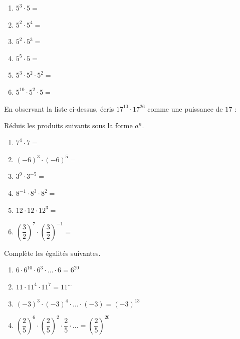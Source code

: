 \documentclass[../math2.tex]{subfiles}
\begin{document}
\begin{enumerate}[cols=2, itemsep=2cm]
	\item $5^3 \cdot 5=$
	\item $5^2 \cdot 5^4=$
	\item $5^2 \cdot 5^3=$
	\item $5^5 \cdot 5=$
	\item $5^3 \cdot 5^2 \cdot 5^2=$
	\item $5^{10} \cdot 5^2 \cdot 5=$
\end{enumerate}
En observant la liste ci-dessus, écris $17^{10}\cdot17^{26}$ comme une puissance de $17$ : \dotfill

\begin{center}
\end{center}

\begin{exercise}
	Réduis les produits suivants sous la forme $a^n$.
	\begin{enumerate} [cols=2]
		\item $7^4\cdot7=$
		\item $(-6)^3\cdot(-6)^5=$
		\item $3^9\cdot 3^{-5}=$
		\item $8^{-1}\cdot 8^3\cdot 8^2=$
		\item $12\cdot 12\cdot 12^3=$
		\item $\left(\dfrac{3}{2}\right)^7\cdot\left(\dfrac{3}{2}\right)^{-1}=$
	\end{enumerate}
\end{exercise}

\begin{exercise}
	Complète les égalités suivantes.
	\begin{enumerate} [cols=2]
		\item $6\cdot6^{10}\cdot6^3\cdot \ldots \cdot 6=6^{20}$
		\item $11\cdot11^4\cdot 11^7=11^{\ldots}$
		\item $(-3)^3\cdot(-3)^4\cdot \ldots \cdot (-3)=(-3)^{13}$
		\item $\left(\dfrac{2}{5}\right)^6\cdot\left(\dfrac{2}{5}\right)^2 \cdot \dfrac{2}{5} \cdot \ldots = \left(\dfrac{2}{5}\right)^{20}$
	\end{enumerate}
\end{exercise}
\end{document}
